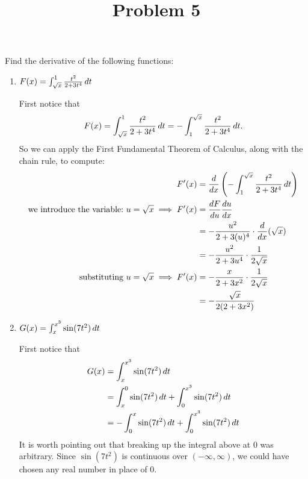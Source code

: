 \documentclass{ximera}
\title[Problem 5]{Problem 5}
\begin{document}
\begin{abstract} \end{abstract}
\maketitle


\begin{problem}
  Find the derivative of the following functions:
  \begin{enumerate}
    
  \item  $F(x) = \int_{\sqrt{x}}^1 \frac{t^2}{2 + 3t^4} \,d t$
    \begin{explanation}
      First notice that
      $$ F(x) = \int_{\sqrt{x}}^1 \frac{t^2}{2 + 3t^4} \,d t = - \int^{\sqrt{x}}_1 \frac{t^2}{2 + 3t^4} \,d t .$$
      So we can apply the First Fundamental Theorem of Calculus, along with the chain rule, to compute:
      \begin{align*}
        F^\prime (x) &= \dfrac{d}{dx} \left( - \int^{\sqrt{x}}_1 \frac{t^2}{2 + 3t^4} \,d t \right)  \\
       \text{we introduce the variable:}\ u=\sqrt x \implies F'(x)&=\frac{dF}{du}\frac{du}{dx}\\ 
                     &= - \frac{u^2}{2 + 3(u)^4} \cdot \dfrac{d}{dx}(\sqrt{x})  \\
                     &= - \frac{u^2}{2+3u^4} \cdot \frac{1}{2 \sqrt{x}}  \\
            \text{substituting}\ u=\sqrt x \implies          F^\prime (x) &= - \frac{x}{2+3x^2} \cdot \frac{1}{2 \sqrt{x}}  \\
            		&= - \frac{\sqrt{x}}{2(2+3x^2)}  
      \end{align*}

    \end{explanation}
  \item  $G(x) = \int_x^{x^3} \sin(7t^2) \,d t$
    \begin{explanation}
      First notice that
      \begin{align*}
        G(x) &= \int_x^{x^3} \sin(7t^2) \,d t  \\
             &= \int_x^0 \sin(7t^2) \,d t + \int_0^{x^3} \sin(7t^2) \,d t  \\
             &=  - \int^x_0 \sin(7t^2) \,d t + \int_0^{x^3} \sin(7t^2) \,d t
      \end{align*}
      It is worth pointing out that breaking up the integral above at $0$ was arbitrary.  Since $\sin(7t^2)$ is continuous over $(-\infty, \infty)$, we could have chosen any real number in place of $0$.
      

\end{explanation}
\end{enumerate}
\end{problem}
\end{document}
